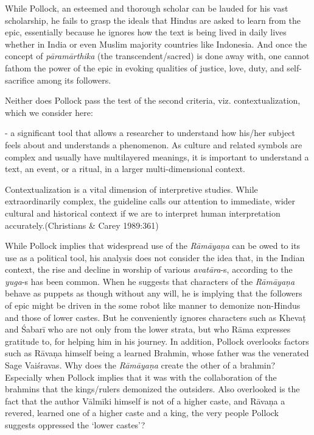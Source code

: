 While Pollock, an esteemed and thorough scholar can be lauded for his vast scholarship, he fails to grasp the ideals that Hindus are asked to learn from the epic, essentially because he ignores how the text is being lived in daily lives whether in India or even Muslim majority countries like Indonesia. And once the concept of \textit{pāramārthika} (the transcendent/sacred) is done away with, one cannot fathom the power of the epic in evoking qualities of justice, love, duty, and self-sacrifice among its followers.

Neither does Pollock pass the test of the second criteria, viz. contextualization, which we consider here:

\begin{myquote}
- a significant tool that allows a researcher to understand how his/her subject feels about and understands a phenomenon. As culture and related symbols are complex and usually have multilayered meanings, it is important to understand a text, an event, or a ritual, in a larger multi-dimensional context.
\end{myquote}

\begin{myquote}
Contextualization is a vital dimension of interpretive studies. While extraordinarily complex, the guideline calls our attention to immediate, wider cultural and historical context if we are to interpret human interpretation accurately.\hfill (Christians \& Carey 1989:361)
\end{myquote}

While Pollock implies that widespread use of the \textit{Rāmāyaṇa} can be owed to its use as a political tool, his analysis does not consider the idea that, in the Indian context, the rise and decline in worship of various \textit{avatāra}-s, according to the \textit{yuga}-s has been common. When he suggests that characters of the \textit{Rāmāyaṇa} behave as puppets as though without any will, he is implying that the followers of epic might be driven in the some robot like manner to demonize non-Hindus and those of lower castes. But he conveniently ignores characters such as Khevaṭ and Śabarī who are not only from the lower strata, but who Rāma expresses gratitude to, for helping him in his journey. In addition, Pollock overlooks factors such as Rāvaṇa himself being a learned Brahmin, whose father was the venerated Sage Vaiśravas. Why does the \textit{Rāmāyaṇa} create the other of a brahmin? Especially when Pollock implies that it was with the collaboration of the brahmins that the kings/rulers demonized the outsiders. Also overlooked is the fact that the author Vālmīki himself is not of a higher caste, and Rāvaṇa a revered, learned one of a higher caste and a king, the very people Pollock suggests oppressed the ‘lower castes’?

